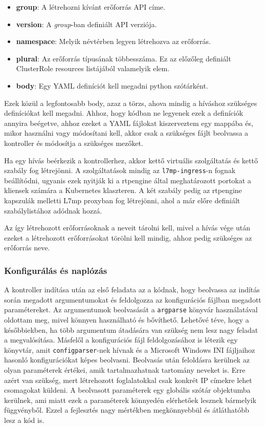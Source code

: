 \begin{itemize}
	\item \textbf{group}: A létrehozni kívánt erőforrás API címe.  
	\item \textbf{version}: A \textit{group}-ban definiált API verziója. 
	\item \textbf{namespace}: Melyik névtérben legyen létrehozva az erőforrás.
	\item \textbf{plural}: Az erőforrás típusának többesszáma. Ez az előzőleg definiált
	ClusterRole resources listájából valamelyik elem. 
	\item \textbf{body}: Egy YAML definíciót kell megadni python szótárként. 
\end{itemize}

Ezek közül a legfontosabb body, azaz a törzs, ahova mindig a híváshoz szükséges 
definíciókat kell megadni. Ahhoz, hogy kódban ne legyenek ezek a definíciók annyira 
beégetve, ahhoz ezeket a YAML fájlokat kiszerveztem egy mappába és, mikor használni vagy 
módosítani kell, akkor csak a szükséges fájlt beolvassa a kontroller és módosítja a 
szükséges mezőket.

Ha egy hívás beérkezik a kontrollerhez, akkor kettő virtuális szolgáltatás és kettő
szabály fog létrejönni. A szolgáltatások mindig az \texttt{l7mp-ingress}-n fognak 
beállítódni, ugyanis ezek nyitják ki a rtpengine által meghatározott portokat a kliensek 
számára a Kubernetes klaszteren. A két szabály pedig az rtpengine kapszulák melletti L7mp 
proxyban fog létrejönni, ahol a már előre definiált szabálylistához adódnak hozzá. 

Az így létrehozott erőforrásoknak a neveit tárolni kell, mivel a hívás vége után ezeket
a létrehozott erőforrásokat törölni kell mindig, ahhoz pedig szükséges az erőforrás 
neve. 

\subsubsection{Konfigurálás és naplózás}

A kontroller indítása után az első feladata az a kódnak, hogy beolvassa az indítás
során megadott argumentumokat és feldolgozza az konfigurációs fájlban megadott 
paramétereket. Az argumentumok beolvasását a \texttt{argparse} \cite{argparse} könyvár 
használatával oldottam meg, mivel könnyen használható és bővíthető. Lehetővé téve, hogy a
későbbiekben, ha több argumentum átadására van szükség nem lesz nagy feladat a 
megvalósítása. Másfelől a konfigurációs fájl feldolgozásához is létezik egy könyvtár, 
amit \texttt{configparser}-nek \cite{configparser} hívnak és a Microsoft Windows INI 
fájljaihoz hasonló konfigurációkat képes beolvasni. Beolvasás után feloldásra kerülnek az 
olyan paraméterek értékei, amik tartalmazhatnak tartomány neveket is. Erre azért van 
szükség, mert létrehozott foglalatokkal csak konkrét IP címekre lehet csomagokat küldeni. 
A beolvasott paraméterek egy globális szótár objektumba kerülnek, ami miatt ezek a 
paraméterek könnyedén elérhetőek lesznek bármelyik függvényből. Ezzel a fejlesztés nagy 
mértékben megkönnyebbül és átláthatóbb lesz a kód is.

